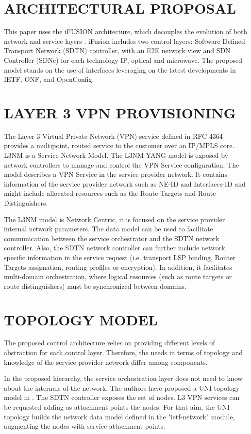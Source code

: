 \documentclass[conference]{IEEEtran}
\begin{document}
\section{ARCHITECTURAL PROPOSAL}

This paper uses the iFUSION architecture, which decouples the evolution of both network and service layers \cite{b2}. iFusion includes two control layers: Software Defined Transport Network (SDTN) controller, with an E2E network view and SDN Controller (SDNc) for each technology IP, optical and microwave. The proposed model stands on the use of interfaces leveraging on the latest developments in IETF, ONF, and OpenConfig.

\section{LAYER 3 VPN PROVISIONING}
The Layer 3 Virtual Private Network (VPN) service defined in RFC 4364 provides a multipoint, routed service to the customer over an IP/MPLS core. 
L3NM \cite{b3} is a Service Network Model. The L3NM YANG model is exposed by network controllers to manage and control the VPN Service configuration. The model describes a VPN Service in the service provider network. It contains information of the service provider network such as NE-ID and Interfaces-ID and might include allocated resources such as the Route Targets and Route Distinguishers.

The L3NM model is Network Centric, it is focused on the service provider internal network parameters. The data model can be used to facilitate communication between the service orchestrator and the SDTN network controller. Also, the SDTN network controller can further include network specific information in the service request (i.e. transport LSP binding, Router Targets assignation, routing profiles or encryption). In addition, it facilitates multi-domain orchestration, where logical resources (such as route targets or route distinguishers) must be synchronized between domains.

\section{TOPOLOGY MODEL}

The proposed control architecture relies on providing different levels of abstraction for each control layer. Therefore, the needs in terms of topology and knowledge of the service provider network differ among components.

In the proposed hierarchy, the service orchestration layer does not need to know about the internals of the network. The authors have proposed a UNI topology model in \cite{b4}. The SDTN controller exposes the set of nodes. L3 VPN services can be requested adding as attachment points the nodes. For that aim, the UNI topology builds the network data model defined in the "ietf-network" module, augmenting the nodes with service-attachment points.
\end{document}
